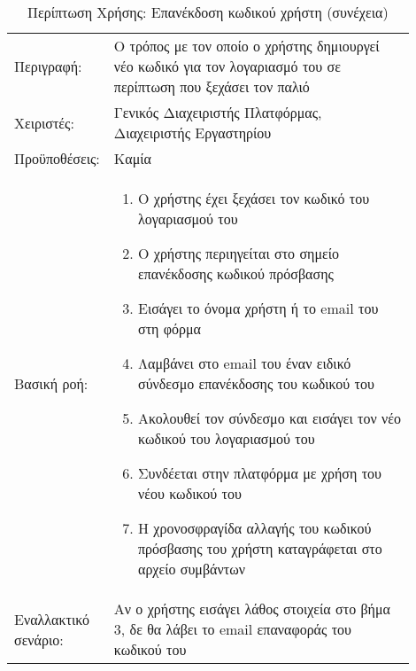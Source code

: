 %
%
\begin{longtable}{|p{0.14\linewidth}|p{0.76\linewidth}|}
	\caption{Περίπτωση Χρήσης: Επανέκδοση κωδικού χρήστη} \label{tab:use-case-forgot-password} \\ \hline \endfirsthead
	\caption[{}]{Περίπτωση Χρήσης: Επανέκδοση κωδικού χρήστη (συνέχεια)} \\ \endhead \endfoot
	Περιγραφή: & Ο τρόπος με τον οποίο ο χρήστης δημιουργεί νέο κωδικό για τον λογαριασμό του σε περίπτωση που ξεχάσει τον παλιό \\ \hline
	Χειριστές: & Γενικός Διαχειριστής Πλατφόρμας, Διαχειριστής Εργαστηρίου \\ \hline
	Προϋποθέσεις: & Καμία \\ \hline
	Βασική ροή: &
	\begin{enumerate}
		\vspace{-1cm}
		\addtolength{\itemindent}{-0.4cm}
		\item Ο χρήστης έχει ξεχάσει τον κωδικό του λογαριασμού του
		\item Ο χρήστης περιηγείται στο σημείο επανέκδοσης κωδικού πρόσβασης
		\item Εισάγει το όνομα χρήστη ή το email του στη φόρμα
		\item Λαμβάνει στο email του έναν ειδικό σύνδεσμο επανέκδοσης του κωδικού του
		\item Ακολουθεί τον σύνδεσμο και εισάγει τον νέο κωδικού του λογαριασμού του
		\item Συνδέεται στην πλατφόρμα με χρήση του νέου κωδικού του
		\item Η χρονοσφραγίδα αλλαγής του κωδικού πρόσβασης του χρήστη καταγράφεται στο αρχείο συμβάντων
		\vspace{-0.7cm}
	\end{enumerate} \\ \hline
	Εναλλακτικό σενάριο: & Αν ο χρήστης εισάγει λάθος στοιχεία στο βήμα 3, δε θα λάβει το email επαναφοράς του κωδικού του \\ \hline
\end{longtable}

